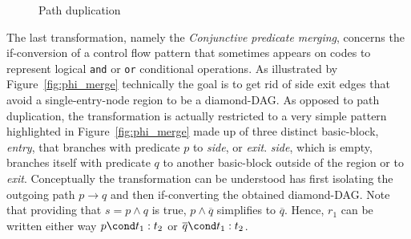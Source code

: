 \begin{figure}[h]
  \caption{\label{fig:phi_aug}Path duplication}
\end{figure}


The last transformation, namely the \emph{Conjunctive predicate merging}, concerns the if-conversion of a control flow pattern that sometimes appears on codes to represent logical \texttt{and} or \texttt{or} conditional operations. As illustrated by Figure~\ref{fig:phi_merge} technically the goal is to get rid of side exit edges that avoid a single-entry-node region to be a diamond-DAG. As opposed to path duplication, the transformation is actually restricted to a very simple pattern highlighted in Figure~\ref{fig:phi_merge} made up of three distinct basic-block, \textit{entry}, that branches with predicate $p$ to \textit{side}, or \textit{exit}. \textit{side}, which is empty, branches itself with predicate $q$ to another basic-block outside of the region or to \textit{exit}. Conceptually the transformation can be understood has first isolating the outgoing path $p\rightarrow q$ and then if-converting the obtained diamond-DAG. Note that providing that $s=p\wedge q$ is true, $p\wedge \overline{q}$ simplifies to $\overline{q}$. Hence, $r_1$ can be written either way $p\cond t_1:t_2$ or  $\overline{q}\cond t_1:t_2$.

